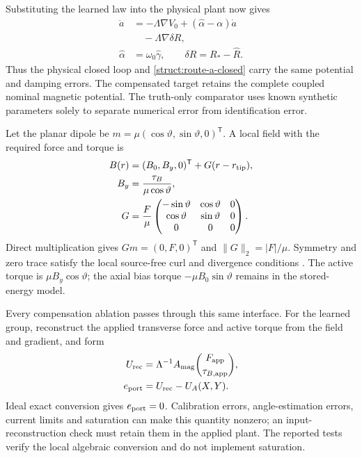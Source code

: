 Substituting the learned law into the physical plant now gives
\begin{align}
 \ddot a&=-\Lambda\nabla V_0
       +(\widehat\alpha-\alpha)\dot a\nonumber\\
       &\quad-\Lambda\nabla\delta R,\nonumber\\
 \widehat\alpha&=\omega_0\widehat\gamma,\qquad
 \delta R=R_*-\widehat R.
 \label{app:physical-closed-loop}
\end{align}
Thus the physical closed loop and
\eqref{struct:route-a-closed} carry the same potential and damping
errors. The compensated target retains the complete coupled nominal
magnetic potential. The truth-only comparator uses known synthetic
parameters solely to separate numerical error from identification
error.

Let the planar dipole be
$m=\mu(\cos\vartheta,\sin\vartheta,0)^{\mathsf T}$.
A local field with the required force and torque is
\begin{align}
 B(r)&=(B_0,B_y,0)^{\mathsf T}+G(r-r_{\rm tip}),\nonumber\\
 B_y&=\frac{\tau_B}{\mu\cos\vartheta},\nonumber\\
 G&=\frac{F}{\mu}
 \begin{pmatrix}
 -\sin\vartheta&\cos\vartheta&0\\
 \cos\vartheta&\sin\vartheta&0\\
 0&0&0
 \end{pmatrix}.
 \label{app:field-gradient}
\end{align}
Direct multiplication gives $Gm=(0,F,0)^{\mathsf T}$ and
$\|G\|_2=|F|/\mu$. Symmetry and zero trace satisfy the local
source-free curl and divergence conditions \citep{abbott}.
The active torque is $\mu B_y\cos\vartheta$; the axial bias torque
$-\mu B_0\sin\vartheta$ remains in the stored-energy model.

Every compensation ablation passes through this same interface.
For the learned group, reconstruct the applied transverse force and active torque from the
field and gradient, and form
\begin{align}
 U_{\rm rec}&=\Lambda^{-1}A_{\rm mag}
                    \binom{F_{\rm app}}{\tau_{B,\rm app}},\nonumber\\
 e_{\rm port}&=U_{\rm rec}-U_A(X,Y).
 \label{app:input-reconstruction}
\end{align}
Ideal exact conversion gives $e_{\rm port}=0$. Calibration errors,
angle-estimation errors, current limits and saturation can make this
quantity nonzero; an input-reconstruction check must retain them in
the applied plant. The reported tests verify the local algebraic
conversion and do not implement saturation.

